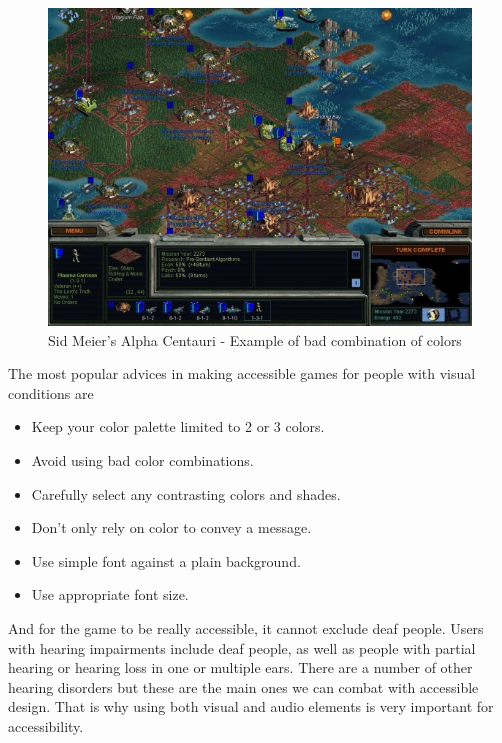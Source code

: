 \documentclass[a4paper,twoside,12pt]{book}
\begin{document}
\begin{figure}
\centering
  \includegraphics[width=\linewidth/2]{centauri.jpg}
  \caption{Sid Meier’s Alpha Centauri - Example of bad combination of colors}
  \label{fig:centauri}
\end{figure}


\par The most popular advices in making accessible games for people with visual conditions are
\begin{itemize}
	\item Keep your color palette limited to 2 or 3 colors.
	\item Avoid using bad color combinations.
	\item Carefully select any contrasting colors and shades.
	\item Don’t only rely on color to convey a message.
	\item Use simple font against a plain background.
	\item Use appropriate font size\cite{bib:dzone}.
\end{itemize}

\par And for the game to be really accessible, it cannot exclude deaf people. Users with hearing impairments include deaf people, as well as people with partial hearing or hearing loss in one or multiple ears. There are a number of other hearing disorders but these are the main ones we can combat with accessible design. That is why using both visual and audio elements is very important for accessibility.
\end{document}
